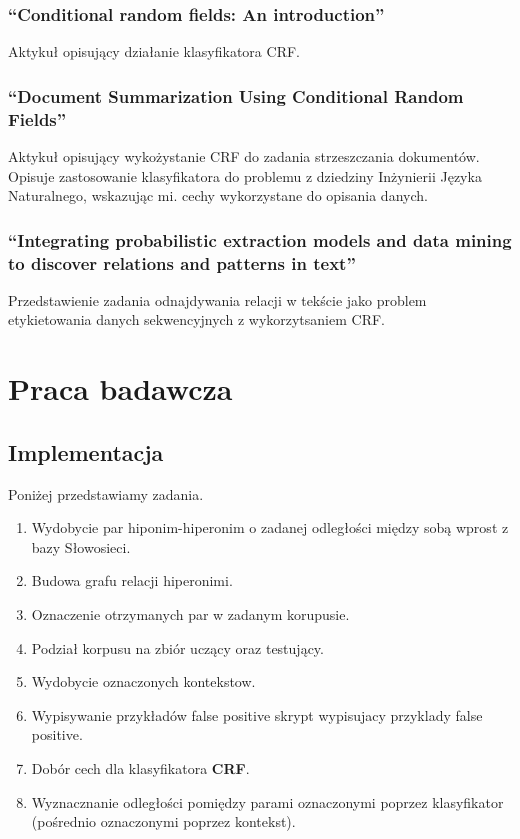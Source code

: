 \documentclass[a4paper,10pt]{report}
\begin{document}
\subsection{``Conditional random fields: An introduction'' \cite{wallach2004crf}}

Aktykuł opisujący działanie klasyfikatora CRF.

\subsection{``Document Summarization Using Conditional Random Fields'' \cite{shen2007doccum}}

Aktykuł opisujący wykożystanie CRF do zadania strzeszczania dokumentów.
Opisuje zastosowanie klasyfikatora do problemu z dziedziny Inżynierii Języka Naturalnego, wskazując mi. cechy wykorzystane do opisania danych.  

\subsection{``Integrating probabilistic extraction models and data mining to discover relations and patterns in text'' \cite{culotta2006integrating}}

Przedstawienie zadania odnajdywania relacji w tekście jako problem etykietowania danych sekwencyjnych z wykorzytsaniem CRF.


\chapter{Praca badawcza}

\section{Implementacja}

\noindent Poniżej przedstawiamy zadania.
\begin{enumerate}
 \item Wydobycie par hiponim-hiperonim o zadanej odległości między sobą wprost z bazy Słowosieci. %
 \item Budowa grafu relacji hiperonimi. %
 \item Oznaczenie otrzymanych par w zadanym korupusie. %
 \item Podział korpusu na zbiór uczący oraz testujący. %
 \item Wydobycie oznaczonych kontekstow. %
 \item Wypisywanie przykładów false positive skrypt wypisujacy przyklady false positive.
 \item Dobór cech dla klasyfikatora \textbf{CRF}.  %
 \item Wyznacznanie odległości pomiędzy parami oznaczonymi poprzez klasyfikator (pośrednio oznaczonymi poprzez kontekst).  %
\end{enumerate}
\end{document}
